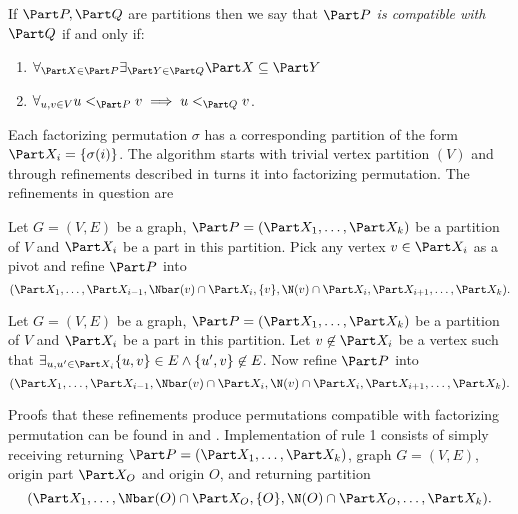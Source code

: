 \begin{defi}
    If $\Part P, \Part Q$ are partitions then we say that \emph{$\Part P$ is compatible with $\Part Q$} if and only if:
    \begin{enumerate}
        \item $\forall_{\Part X \in \Part P} \exists_{\Part Y \in \Part Q} \Part X \subseteq \Part Y$
        \item $\forall_{u,v \in V} u <_{\Part P} v \implies u <_{\Part Q} v$.
    \end{enumerate}
\end{defi}

Each factorizing permutation $\sigma$ has a corresponding partition of the form $\Part X_i = \{\sigma(i)\}$. The algorithm starts with trivial vertex partition $(V)$ and through refinements described in \cite{habib2} turns it into factorizing permutation. The refinements in question are

\begin{defi}\label{habib:refrule1}
    Let $G=(V,E)$ be a graph, $\Part P = (\Part X_1, \ldots, \Part X_k)$ be a partition of $V$ and $\Part X_i$ be a part in this partition. Pick any vertex $v \in \Part X_i$ as a pivot and refine $\Part P$ into
    \[
        (\Part X_1, \ldots, \Part X_{i-1}, \Nbar(v) \cap \Part X_i, \{v\}, \N(v) \cap \Part X_i, \Part X_{i+1}, \ldots, \Part X_k).
    \]
\end{defi}

\begin{defi}\label{habib:refrule2}
    Let $G=(V,E)$ be a graph, $\Part P = (\Part X_1, \ldots, \Part X_k)$ be a partition of $V$ and $\Part X_i$ be a part in this partition. Let $v \not\in \Part X_i$ be a vertex such that $\exists_{u,u' \in \Part X_i} \{u,v\} \in E \land \{u',v\} \not\in E$. Now refine $\Part P$ into
    \[
        (\Part X_1, \ldots, \Part X_{i-1}, \Nbar(v) \cap \Part X_i, \N(v) \cap \Part X_i, \Part X_{i+1}, \ldots, \Part X_k).
    \]
\end{defi}

Proofs that these refinements produce permutations compatible with factorizing permutation can be found in \cite{habib} and \cite{habib2}. Implementation of rule 1 consists of simply receiving returning $\Part P = (\Part X_1, \ldots, \Part X_k)$, graph $G=(V,E)$, origin part $\Part X_O$ and origin $O$, and returning partition
\[
    (\Part X_1, \ldots, \Nbar(O) \cap \Part X_O, \{O\}, \N(O) \cap \Part X_O, \ldots, \Part X_k).
\]
% 

